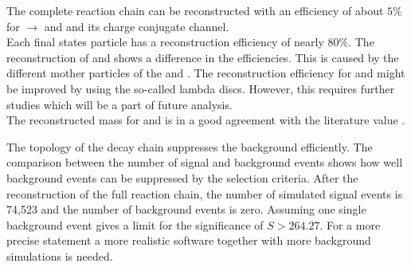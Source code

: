 The complete reaction chain can be reconstructed with an efficiency of about $5\%$ for \pbarpSystem $\rightarrow$ \excitedcascade and \anticascade and its
charge conjugate channel.\\
Each final states particle has a reconstruction efficiency of nearly $80\%$.
The reconstruction of \lam and \alam shows a difference in the efficiencies.
This is caused by the different mother particles of the \lam and \alam. 
The reconstruction efficiency for \lam and \alam might be improved by using the so-called lambda discs.
However, this requires further studies which will be a part of future analysis.\\
The reconstructed mass for \excitedcascade and \excitedanticascade is in a good agreement with the literature value \cite{PDG}.

The topology of the decay chain suppresses the background efficiently.
The comparison between the number of signal and background events shows how well background events can be suppressed by the selection criteria.
After the reconstruction of the full reaction chain, the number of simulated signal events is 74,523 and the number of background events is zero. 
Assuming one single background event gives a limit for the significance of $S>264.27$.
For a more precise statement a more realistic software together with more background simulations is needed. 

 
  



